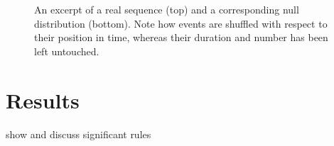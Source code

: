 \begin{figure}
	\centering
	
	\caption{An excerpt of a real sequence (top) and a corresponding null distribution (bottom). Note how events are shuffled with respect to their position in time, whereas their duration and number has been left untouched.}
	\label{fig:null}
\end{figure}

%

\section{Results}
\label{sec:significanceresults}
show and discuss significant rules
